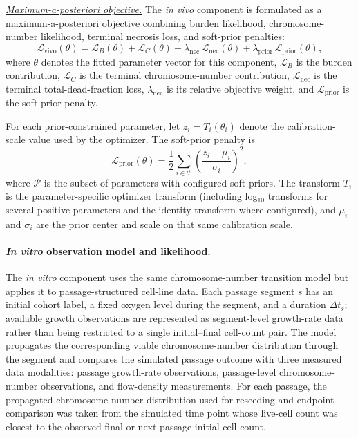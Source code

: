 \documentclass[11pt]{article}
\begin{document}
\underline{\textit{Maximum-a-posteriori objective.}} The \textit{in vivo} component is formulated as a maximum-a-posteriori objective combining burden likelihood, chromosome-number likelihood, terminal necrosis loss, and soft-prior penalties:
\begin{equation}
\mathcal L_{\mathrm{vivo}}(\theta)
=
\mathcal L_B(\theta)
+
\mathcal L_C(\theta)
+
\lambda_{\mathrm{nec}}
\,
\mathcal L_{\mathrm{nec}}(\theta)
+
\lambda_{\mathrm{prior}}
\,
\mathcal L_{\mathrm{prior}}(\theta),
\label{eq:appendix_objective}
\end{equation}
where $\theta$ denotes the fitted parameter vector for this component, $\mathcal L_B$ is the burden contribution, $\mathcal L_C$ is the terminal chromosome-number contribution, $\mathcal L_{\mathrm{nec}}$ is the terminal total-dead-fraction loss, $\lambda_{\mathrm{nec}}$ is its relative objective weight, and $\mathcal L_{\mathrm{prior}}$ is the soft-prior penalty.


For each prior-constrained parameter, let $z_i=T_i(\theta_i)$ denote the calibration-scale value used by the optimizer. The soft-prior penalty is
\begin{equation}
\mathcal{L}_{\mathrm{prior}}(\theta)
=
\frac{1}{2}
\sum_{i \in \mathcal{P}}
\left(
\frac{z_i - \mu_i}{\sigma_i}
\right)^2 ,
\label{eq:prior_penalty}
\end{equation}
where $\mathcal{P}$ is the subset of parameters with configured soft priors. The transform $T_i$ is the parameter-specific optimizer transform (including log$_{10}$ transforms for several positive parameters and the identity transform where configured), and $\mu_i$ and $\sigma_i$ are the prior center and scale on that same calibration scale.

\paragraph{\textit{In vitro} observation model and likelihood.}

The \textit{in vitro} component uses the same chromosome-number transition model but applies it to passage-structured cell-line data. Each passage segment $s$ has an initial cohort label, a fixed oxygen level during the segment, and a duration $\Delta t_s$; available growth observations are represented as segment-level growth-rate data rather than being restricted to a single initial--final cell-count pair. The model propagates the corresponding viable chromosome-number distribution through the segment and compares the simulated passage outcome with three measured data modalities: passage growth-rate observations, passage-level chromosome-number observations, and flow-density measurements. For each passage, the propagated chromosome-number distribution used for reseeding and endpoint comparison was taken from the simulated time point whose live-cell count was closest to the observed final or next-passage initial cell count.
\end{document}

